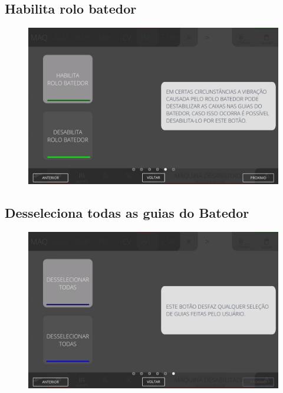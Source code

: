 \newpage
\thispagestyle{fancy}
\vspace*{40 pt}
\subsection{Habilita rolo batedor}
\vspace*{\fill}
\begin{figure}[h]
    \centering
    \includegraphics[width=576 px,height=360 px]{src/imagesICV/07-scout/commands/5.png}
\end{figure}
\vspace*{\fill}

\newpage
\thispagestyle{fancy}
\vspace*{40 pt}
\subsection{Desseleciona todas as guias do Batedor}
\vspace*{\fill}
\begin{figure}[h]
    \centering
    \includegraphics[width=576 px,height=360 px]{src/imagesICV/07-scout/commands/6.png}
\end{figure}
\vspace*{\fill}

